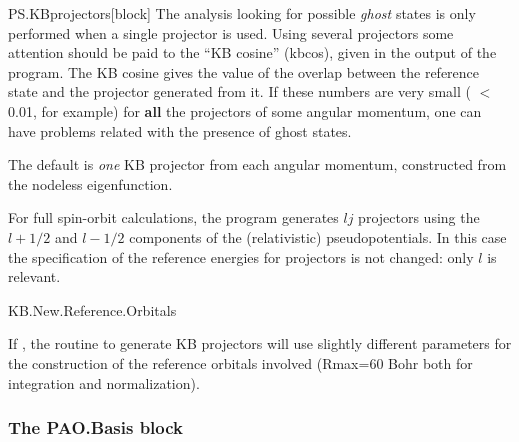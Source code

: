 \begin{fdfentry}{PS.KBprojectors}[block]
The analysis looking for possible \textit{ghost} states is only performed
when a single projector is used.  Using several projectors some
attention should be paid to the ``KB cosine'' (kbcos), given in the
output of the program.  The KB cosine gives the value of the overlap
between the reference state and the projector generated from it.  If
these numbers are very small ( $<$ 0.01, for example) for \textbf{all}
the projectors of some angular momentum, one can have problems related
with the presence of ghost states.

The default is \emph{one} KB projector from each angular momentum,
constructed from the nodeless eigenfunction.

For full spin-orbit calculations, the program generates $lj$
projectors using the $l+1/2$ and $l-1/2$ components of the
(relativistic) pseudopotentials. In this case the specification of the
reference energies for projectors is not changed: only $l$ is
relevant.

\end{fdfentry}  


\begin{fdflogicalF}{KB.New.Reference.Orbitals}

  If \fdftrue, the routine to generate KB projectors will use slightly
  different parameters for the construction of the reference orbitals
  involved (Rmax=60 Bohr both for integration and normalization).
  
\end{fdflogicalF}


\subsubsection{The PAO.Basis block}


